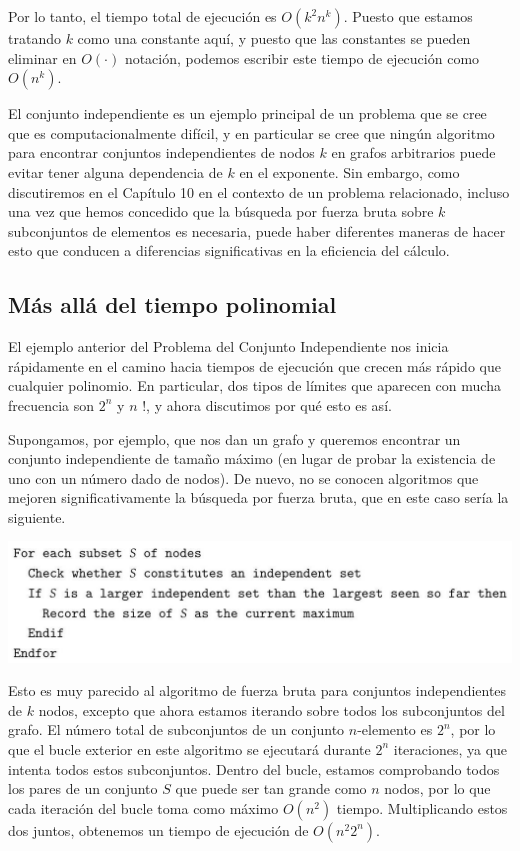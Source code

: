\documentclass[a4paper, 12pt]{book}
\theoremstyle{dotless}
\begin{document}
Por lo tanto, el tiempo total de ejecución es $ O\left(k^{2} n^{k}\right)$. Puesto que estamos tratando $k$ como una constante aquí, y puesto que las constantes se pueden eliminar en $O(\cdot)$ notación, podemos escribir este tiempo de ejecución como $O\left(n^{k}\right)$.

El conjunto independiente es un ejemplo principal de un problema que se cree que es computacionalmente difícil, y en particular se cree que ningún algoritmo para encontrar conjuntos independientes de nodos $k$ en grafos arbitrarios puede evitar tener alguna dependencia de $k$ en el exponente. Sin embargo, como discutiremos en el Capítulo 10 en el contexto de un problema relacionado, incluso una vez que hemos concedido que la búsqueda por fuerza bruta sobre $k$ subconjuntos de elementos es necesaria, puede haber diferentes maneras de hacer esto que conducen a diferencias significativas en la eficiencia del cálculo.

\subsection*{Más allá del tiempo polinomial}
El ejemplo anterior del Problema del Conjunto Independiente nos inicia rápidamente en el camino hacia tiempos de ejecución que crecen más rápido que cualquier polinomio. En particular, dos tipos de límites que aparecen con mucha frecuencia son $2^{n}$ y $n$ !, y ahora discutimos por qué esto es así.

Supongamos, por ejemplo, que nos dan un grafo y queremos encontrar un conjunto independiente de tamaño máximo (en lugar de probar la existencia de uno con un número dado de nodos). De nuevo, no se conocen algoritmos que mejoren significativamente la búsqueda por fuerza bruta, que en este caso sería la siguiente.

\begin{center}
\includegraphics[width=\textwidth]{./Imagenes-Seccion2/2023_08_07_379b6f7f3185549667e3g-08}
\end{center}

Esto es muy parecido al algoritmo de fuerza bruta para conjuntos independientes de $k$ nodos, excepto que ahora estamos iterando sobre todos los subconjuntos del grafo. El número total de subconjuntos de un conjunto $n$-elemento es $2^{n}$, por lo que el bucle exterior en este algoritmo se ejecutará durante $2^{n}$ iteraciones, ya que intenta todos estos subconjuntos. Dentro del bucle, estamos comprobando todos los pares de un conjunto $S$ que puede ser tan grande como $n$ nodos, por lo que cada iteración del bucle toma como máximo $O\left(n^{2}\right)$ tiempo. Multiplicando estos dos juntos, obtenemos un tiempo de ejecución de $O\left(n^{2} 2^{n}\right)$.
\end{document}
